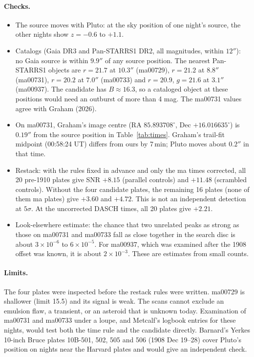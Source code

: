 \documentclass[11pt]{article}
\begin{document}
\paragraph{Checks.}
\begin{itemize}
\item The source moves with Pluto: at the sky position of one night's source, the other nights show $z=-0.6$ to $+1.1$.
\item Catalogs (Gaia DR3 and Pan-STARRS1 DR2, all magnitudes, within $12''$): no Gaia source is within $9.9''$ of any source position. The nearest Pan-STARRS1 objects are $r=21.7$ at $10.3''$ (ma00729), $r=21.2$ at $8.8''$ (ma00731), $r=20.2$ at $7.0''$ (ma00733) and $r=20.9$, $g=21.6$ at $3.1''$ (ma00937). The candidate has $B\approx16.3$, so a cataloged object at these positions would need an outburst of more than 4 mag. The ma00731 values agree with Graham (2026).
\item On ma00731, Graham's image centre (RA $85.893708^\circ$, Dec $+16.016635^\circ$) is $0.19''$ from the source position in Table~\ref{tab:times}. Graham's trail-fit midpoint (00:58:24 UT) differs from ours by 7\,min; Pluto moves about $0.2''$ in that time.
\item Restack: with the rules fixed in advance and only the ma times corrected, all 20 pre-1910 plates give SNR $+8.15$ (parallel controls) and $+11.48$ (scrambled controls). Without the four candidate plates, the remaining 16 plates (none of them ma plates) give $+3.60$ and $+4.72$. This is not an independent detection at $5\sigma$. At the uncorrected DASCH times, all 20 plates give $+2.21$.
\item Look-elsewhere estimate: the chance that two unrelated peaks as strong as those on ma00731 and ma00733 fall as close together in the search disc is about $3\times10^{-6}$ to $6\times10^{-5}$. For ma00937, which was examined after the 1908 offset was known, it is about $2\times10^{-3}$. These are estimates from small counts.
\end{itemize}

\paragraph{Limits.} The four plates were inspected before the restack rules were written. ma00729 is shallower (limit 15.5) and its signal is weak. The scans cannot exclude an emulsion flaw, a transient, or an asteroid that is unknown today. Examination of ma00731 and ma00733 under a loupe, and Metcalf's logbook entries for these nights, would test both the time rule and the candidate directly. Barnard's Yerkes 10-inch Bruce plates 10B-501, 502, 505 and 506 (1908 Dec 19--28) cover Pluto's position on nights near the Harvard plates and would give an independent check.
\end{document}
